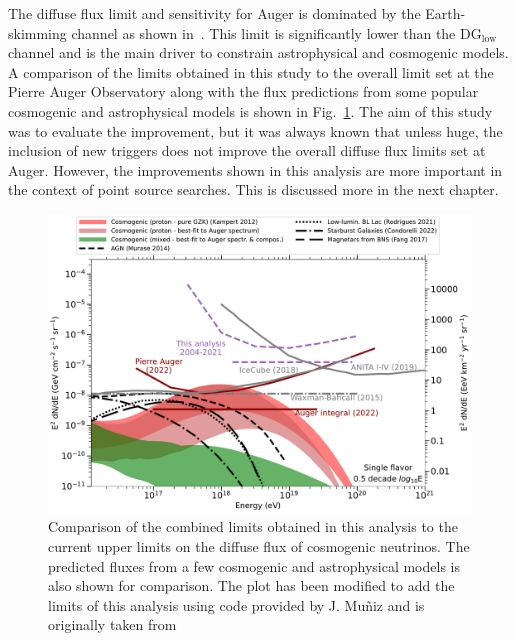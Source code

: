 The diffuse flux limit and sensitivity for Auger is dominated by the Earth-skimming channel as shown in~\cite{Aab_2019_diffuse}. This limit is significantly lower than the DG$\mathrm{_{\text{low}}}$ channel and is the main driver to constrain astrophysical and cosmogenic models. A comparison of the limits obtained in this study to the overall limit set at the Pierre Auger Observatory along with the flux predictions from some popular cosmogenic and astrophysical models is shown in Fig.~\ref{fig:Limit_comp_overall}. The aim of this study was to evaluate the improvement, but it was always known that unless huge, the inclusion of new triggers does not improve the overall diffuse flux limits set at Auger. However, the improvements shown in this analysis are more important in the context of point source searches. This is discussed more in the next chapter. 

\begin{figure}[h!]
  \centering
  \includegraphics[width=14.5cm]{thesis_figures/ExpLimits/limits_and_models_DGL.pdf}
  \caption{Comparison of the combined limits obtained in this analysis to the current upper limits on the diffuse flux of cosmogenic neutrinos. The predicted fluxes from a few cosmogenic and astrophysical models is also shown for comparison. The plot has been modified to add the limits of this analysis using code provided by J. Muñiz and is originally taken from ~\cite{PierreAuger:2023pjg}}
  \label{fig:Limit_comp_overall}
\end{figure}



